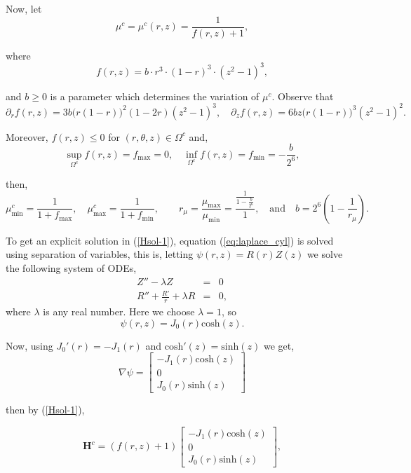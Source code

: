 \documentclass{book}
\newcounter{number_tests_sfemans}
\begin{document}
\noindent Now, let
\begin{equation}
{\mu^c}={\mu^c(r,z)}=\frac{1}{f(r,z)+1 },
\end{equation}

\noindent where $$f(r,z)= b \cdot r^3 \cdot (1-r)^3 \cdot (z^2-1)^3,$$
 
\noindent and  $b\geq 0 $ is a  parameter which determines the variation of ${\mu}^c$.
\noindent Observe that 
$$
\partial _r f(r,z) = 3b\big ( r(1-r)\big )^2(1-2r)(z^2-1)^3,
\quad
\partial _z f(r,z) = 6bz\big  (r(1-r))^3 (z^2-1)^2.
$$



Moreover,  $f (r,z) \leq 0$ for $(r,\theta,z) \in \Omega^c$ and,
$$
\sup _{\Omega^c} f(r,z)=f_{\text{max}}=0 , 
\quad 
\inf _{\Omega^c} f(r,z)=f_{\text{min}}= -\frac{b}{2^6}, 
$$

\noindent then,
$$
\mu_{\text{min}} ^c = \frac{1}{1 + f_{\text{max}}},\quad   \mu_{\text{max}} ^c =\frac{1}{1 + f_{\text{min}}},
 \quad  \quad r_{\mu}=\frac{\mu _{\text{max}}}{\mu _{\text{min}}}=\frac{\frac{1}{1-\frac{b}{2^6}}}{1}, \quad \text{and} \quad b= 2^6\left (1- \frac{1}{r_{\mu}}\right).
$$



\noindent To get an explicit solution in (\ref{Hsol-1}),  equation (\ref{eq:laplace_cyl}) is solved using separation of variables, this is, letting
$\psi(r,z)=R(r)Z(z)$ we solve the following system of ODEs,
\begin{eqnarray*}
Z''-\lambda Z & = & 0 \\
R''+\frac{R'}{r}+\lambda  R & = & 0,
\end{eqnarray*}
where $\lambda$ is any real number. Here we choose $\lambda=1$, so
\begin{equation}
\label{psi-sol1}
\psi(r,z)=J_0(r)\text{cosh}(z).
\end{equation}

\noindent Now, using $J_0'(r)=-J_1(r)$ and $\text{cosh}'(z)=\text{sinh}(z)$  we get,
\begin{equation}
\nabla \psi = \left[ \begin{array}{c} -J_1 (r)  \text{cosh}(z) \\ 0 \\J_0 (r)  \text{sinh}(z) \end{array} \right]
\end{equation}

\noindent then by (\ref{Hsol-1}), 

\begin{equation}
\mathbf{H}^c=(f(r,z)+1)
\left[ \begin{array}{c} -J_1 (r)  \text{cosh}(z) \\ 0 \\J_0 (r)  \text{sinh}(z) \end{array} \right],
\end{equation}
\end{document}
